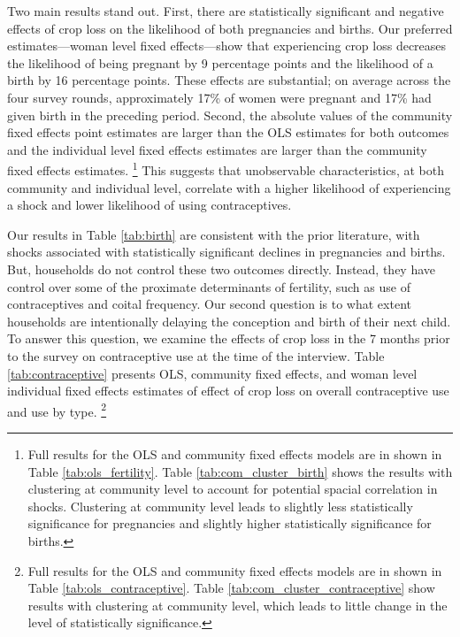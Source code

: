 \documentclass[letterpaper,12pt]{article}
\begin{document}



Two main results stand out.
First, there are statistically significant and negative effects of crop loss on the
likelihood of both pregnancies and births.
Our preferred estimates---woman level fixed effects---show that experiencing 
crop loss decreases the likelihood of being pregnant by 9 percentage points 
and the likelihood of a birth by 16 percentage points.
These effects are substantial; on average across the four survey rounds, approximately 
17\% of women were pregnant and 17\% had given birth in the preceding period. 
Second, the absolute values of the community fixed effects point estimates are 
larger than the OLS estimates for both outcomes and the individual level
fixed effects estimates are larger than the community fixed effects estimates.%
\footnote{
Full results for the OLS and community fixed effects models are in shown in 
Table \ref{tab:ols_fertility}.
Table \ref{tab:com_cluster_birth} shows the results with clustering at community level
to account for potential spacial correlation in shocks.
Clustering at community level leads to slightly less statistically significance for 
pregnancies and slightly higher statistically significance for births.
}
This suggests that unobservable characteristics, at both community
and individual level, correlate with a higher likelihood of experiencing 
a shock and lower likelihood of using contraceptives.





Our results in Table \ref{tab:birth} are consistent with the prior literature,
with shocks associated with statistically significant declines in pregnancies 
and births.
But, households do not control these two outcomes directly.
Instead, they have control over some of the proximate determinants of fertility, 
such as use of contraceptives and coital frequency.
Our second question is to what extent households are intentionally delaying 
the conception and birth of their next child. 
To answer this question, we examine the effects of crop loss in the 7 months
prior to the survey on contraceptive use at the time of the interview. 
Table \ref{tab:contraceptive} presents OLS, community fixed effects, and woman 
level individual fixed effects estimates of  effect of crop loss on overall 
contraceptive use and use by type.%
\footnote{
Full results for the OLS and community fixed effects models are in shown in 
Table \ref{tab:ols_contraceptive}.
Table \ref{tab:com_cluster_contraceptive} show results with clustering at
community level, which leads to little change in the level of
statistically significance.
}
\end{document}
